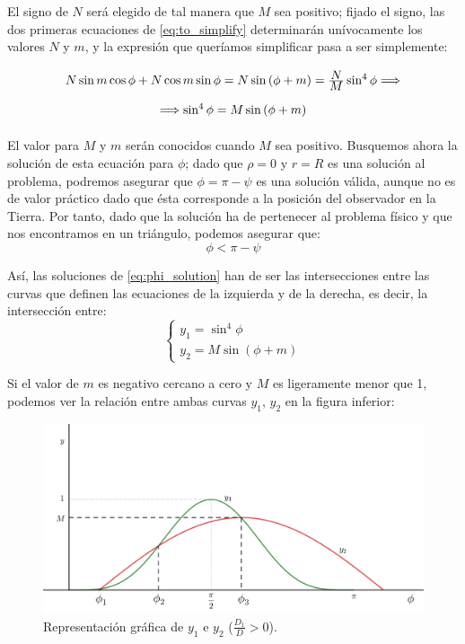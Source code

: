 \documentclass[11pt]{article}
\newcommand\ddfrac[2]{\frac{\displaystyle #1}{\displaystyle #2}}
\begin{document}
El signo de $N$ será elegido de tal manera que $M$ sea positivo; fijado el signo, las dos primeras ecuaciones de \eqref{eq:to_simplify} determinarán unívocamente los valores $N$ y $m$, y la expresión que queríamos simplificar pasa a ser simplemente:
\begin{align}
\def\arraystretch{2}
\begin{array}{c}
	N\sin{m}\cos{\phi}+N\cos{m}\sin{\phi}=N\sin{(\phi+m)}=\ddfrac{N}{M}\sin^4{\phi} \Longrightarrow\\
	\Longrightarrow\sin^4{\phi}=M\sin{(\phi+m)}
\end{array}
\label{eq:phi_solution}
\end{align}

El valor para $M$ y $m$ serán conocidos cuando $M$ sea positivo. Busquemos ahora la solución de esta ecuación para $\phi$; dado que $\rho=0$ y $r=R$ es una solución al problema, podremos asegurar que $\phi=\pi-\psi$ es una solución válida, aunque no es de valor práctico dado que ésta corresponde a la posición del observador en la Tierra. Por tanto, dado que la solución ha de pertenecer al problema físico y que nos encontramos en un triángulo, podemos asegurar que:
\[
\phi<\pi-\psi
\]

Así, las soluciones de \eqref{eq:phi_solution} han de ser las intersecciones entre las curvas que definen las ecuaciones de la izquierda y de la derecha, es decir, la intersección entre:
\[
\left\{
\begin{array}{l}
y_1=\sin^4{\phi}\\
y_2=M\sin{(\phi+m)}
\end{array}
\right.
\]

Si el valor de $m$ es negativo cercano a cero y $M$ es ligeramente menor que 1, podemos ver la relación entre ambas curvas $y_1$, $y_2$ en la figura inferior:

\begin{figure}[H]
\centering
\includegraphics[scale=0.125]{images/phi_solution_m_negative_M_near_1.png}
\caption{Representación gráfica de $y_1$ e $y_2$ ($\frac{D_1}{D}>0$).}
\label{fig:phi_solution_m_negative_M_near_1}
\end{figure}
\end{document}

